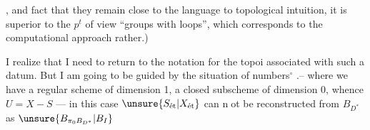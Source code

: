 , and   fact that they remain  close to the language  to topological intuition, it is superior to the $p^t$ of view ``groups with loops'', which corresponds to the computational approach rather.)


I realize that I need to return to the notation for the   topoi associated with such a datum. But I am going to be guided by the situation of numbers$^\circ$ .-- where we have a regular scheme  of dimension 1, a closed subscheme  of dimension 0, whence $U=X-S$ --- in this case  $\unsure{S_{\text{ét}}|X_{\text{ét}}}$ can \textcircled{not} be reconstructed from $B_{D^*}$ as $\unsure{B_{\pi_0 B_{D^*}}|B_I}$


